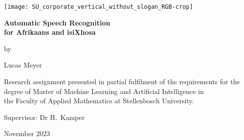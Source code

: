 \graphicspath{{frontmatter/fig/}}

\begin{titlepage}
	\begin{center}
		
        \texttt{[image: SU\_corporate\_vertical\_without\_slogan\_RGB-crop]}
				
		\vfill
		
		{\sffamily \bfseries \huge Automatic Speech Recognition \\for Afrikaans and isiXhosa \par}
		
		\vfill
		
        {\large by \\[5pt]}
		{\large {\Large Lucas Meyer} \par}
		
		\vfill
		
		\vfill
		
		
		
		{\large Research assignment presented in partial fulfilment of the requirements for the degree of Master of Machine Learning and Artificial Intelligence in \\the Faculty of Applied Mathematics at Stellenbosch University. \par}
		
		
		\vfill
		
		{\large {Supervisor}: Dr H.\ Kamper}\par
		
		\vfill
		
		{\Large November 2023}
	\end{center}
\end{titlepage}
